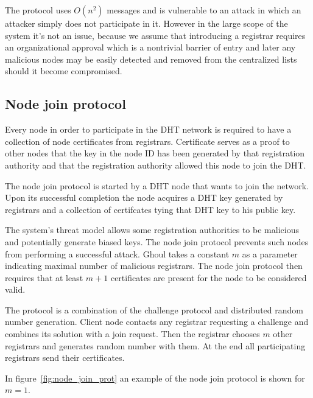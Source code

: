The protocol uses $O\left(n^2\right)$ messages and is vulnerable to an attack in
which an attacker simply does not participate in it. However in the large scope
of the system it's not an issue, because we assume that introducing a registrar
requires an organizational approval which is a nontrivial barrier of entry and
later any malicious nodes may be easily detected and removed from the
centralized lists should it become compromised.

\subsection{Node join protocol}

Every node in order to participate in the DHT network is required to have a
collection of node certificates from registrars. Certificate serves as a proof
to other nodes that the key in the node ID has been generated by that
registration authority and that the registration authority allowed this node to
join the DHT.

The node join protocol is started by a DHT node that wants to join the network.
Upon its successful completion the node acquires a DHT key generated by
registrars and a collection of certifcates tying that DHT key to his public key.

The system's threat model allows some registration authorities to be malicious
and potentially generate biased keys. The node join protocol prevents such nodes
from performing a successful attack. Ghoul takes a constant $m$ as a parameter 
indicating maximal number of malicious registrars. The node join protocol then
requires that at least $m+1$ certificates are present for the node to be
considered valid.

The protocol is a combination of the challenge protocol and distributed random
number generation. Client node contacts any registrar requesting a challenge and
combines its solution with a join request. Then the registrar chooses $m$ other
registrars and generates random number with them. At the end all participating
registrars send their certificates.

In figure~\ref{fig:node_join_prot} an example of the node join protocol is shown
for $m=1$.

